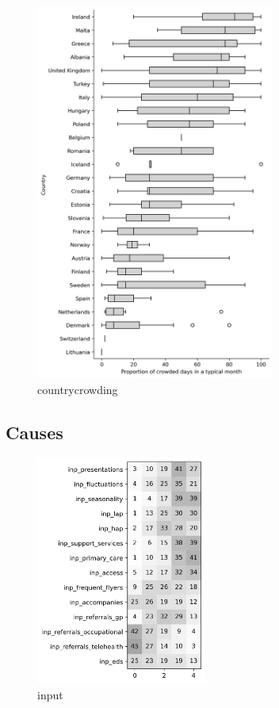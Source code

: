 \documentclass{article}
\begin{document}
\begin{figure}[H]
    \centering
        \includegraphics[width=0.7\textwidth]{../output/plots/country_crowding}
        \caption{countrycrowding}
        \label{fig:country_crowding}
\end{figure}

\subsection{Causes}



\begin{figure}[H]
    \centering
        \includegraphics[width=0.5\textwidth]{../output/plots/input}
        \caption{input}
        \label{fig:input}
\end{figure}
\end{document}
